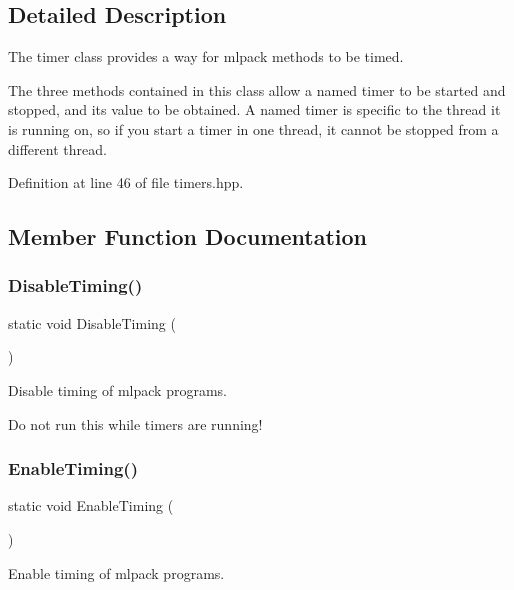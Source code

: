 \subsection{Detailed Description}
The timer class provides a way for mlpack methods to be timed. 

The three methods contained in this class allow a named timer to be started and stopped, and its value to be obtained. A named timer is specific to the thread it is running on, so if you start a timer in one thread, it cannot be stopped from a different thread. 

Definition at line 46 of file timers.\+hpp.



\subsection{Member Function Documentation}
\mbox{\label{classmlpack_1_1Timer_a2c8b89142749d77f82338da28267f37c}} 
\subsubsection{Disable\+Timing()}
{\footnotesize\ttfamily static void Disable\+Timing (\begin{DoxyParamCaption}{ }\end{DoxyParamCaption})\hspace{0.3cm}{\ttfamily [static]}}



Disable timing of mlpack programs. 

Do not run this while timers are running! \mbox{\label{classmlpack_1_1Timer_a41f8422720891efeaf30a43f6a7bbc7f}} 
\subsubsection{Enable\+Timing()}
{\footnotesize\ttfamily static void Enable\+Timing (\begin{DoxyParamCaption}{ }\end{DoxyParamCaption})\hspace{0.3cm}{\ttfamily [static]}}



Enable timing of mlpack programs. 

